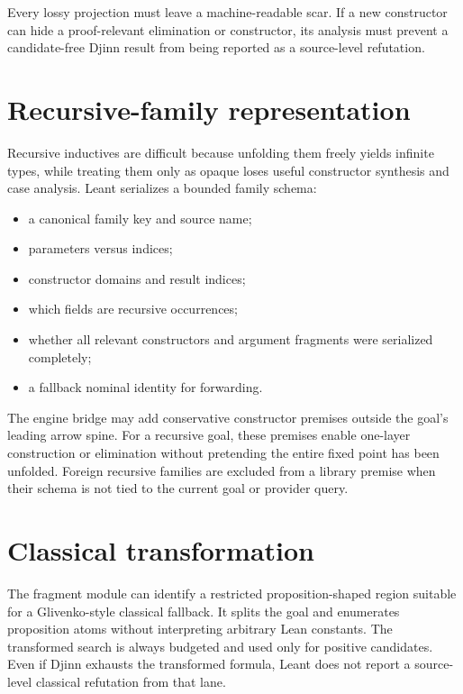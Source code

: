 \documentclass[10pt,letterpaper,oneside]{report}
\newcommand{\code}[1]{\texttt{\detokenize{#1}}}
\begin{document}
\begin{invariantbox}
Every lossy projection must leave a machine-readable scar. If a new \code{Frag} constructor can hide a proof-relevant elimination or constructor, its analysis must prevent a candidate-free Djinn result from being reported as a source-level refutation.
\end{invariantbox}

\section{Recursive-family representation}

Recursive inductives are difficult because unfolding them freely yields infinite types, while treating them only as opaque loses useful constructor synthesis and case analysis. Leant serializes a bounded family schema:

\begin{itemize}
  \item a canonical family key and source name;
  \item parameters versus indices;
  \item constructor domains and result indices;
  \item which fields are recursive occurrences;
  \item whether all relevant constructors and argument fragments were serialized completely;
  \item a fallback nominal identity for forwarding.
\end{itemize}

The engine bridge may add conservative constructor premises outside the goal's leading arrow spine. For a recursive goal, these premises enable one-layer construction or elimination without pretending the entire fixed point has been unfolded. Foreign recursive families are excluded from a library premise when their schema is not tied to the current goal or provider query.

\section{Classical transformation}

The fragment module can identify a restricted proposition-shaped region suitable for a Glivenko-style classical fallback. It splits the goal and enumerates proposition atoms without interpreting arbitrary Lean constants. The transformed search is always budgeted and used only for positive candidates. Even if Djinn exhausts the transformed formula, Leant does not report a source-level classical refutation from that lane.
\end{document}
